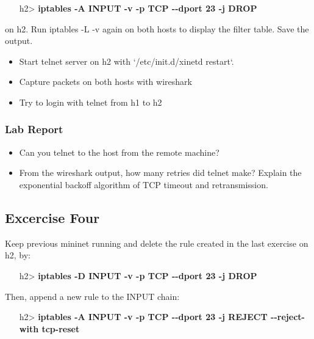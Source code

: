 \documentclass[10pt,a4paper]{article}
\numberwithin{equation}{section}
\numberwithin{figure}{section}
\numberwithin{table}{section}
\begin{document}
\begin{itemize}
	\setlength{\itemindent}{10pt}
	\item [h2>] \textbf{iptables -A INPUT -v -p TCP {-}{-}dport 23 -j DROP} 
\end{itemize}

\setlength{\parindent}{0pt}
on h2. Run iptables -L -v again on both hosts to display the filter table. Save the output.\\


\begin{itemize}
	\setlength{\itemindent}{0pt}
	\item Start telnet server on h2 with `/etc/init.d/xinetd restart`.
	\item Capture packets on both hosts with wireshark
	\item Try to login with telnet from h1 to h2
\end{itemize}

\subsubsection*{ Lab Report}
\begin{itemize}
	\setlength{\itemindent}{0pt}
	\item Can you telnet to the host from the remote machine?
	\item From the wireshark output, how many retries did telnet make? Explain the exponential backoff algorithm of TCP timeout and retransmission.
\end{itemize}

\subsection*{Excercise Four}
Keep previous mininet running and delete the rule created in the last exercise on h2, by:

\begin{itemize}
	\setlength{\itemindent}{10pt}
	\item [h2>] \textbf{iptables -D INPUT -v -p TCP {-}{-}dport 23 -j DROP} 
\end{itemize}

\setlength{\parindent}{0pt}
Then, append a new rule to the INPUT chain:

\begin{itemize}
	\setlength{\itemindent}{10pt}
	\item [h2>] \textbf{iptables -A INPUT -v -p TCP {-}{-}dport 23 -j REJECT {-}{-}reject-with tcp-reset} 
\end{itemize}
\end{document}
